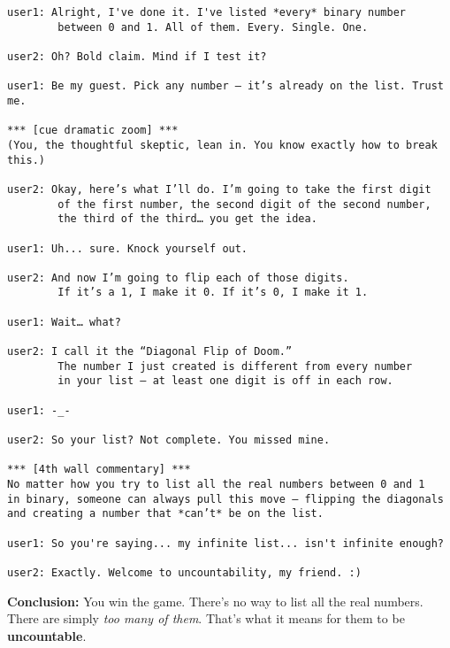 \begin{verbatim}
user1: Alright, I've done it. I've listed *every* binary number 
        between 0 and 1. All of them. Every. Single. One.

user2: Oh? Bold claim. Mind if I test it?

user1: Be my guest. Pick any number — it’s already on the list. Trust me.

*** [cue dramatic zoom] ***
(You, the thoughtful skeptic, lean in. You know exactly how to break this.)

user2: Okay, here’s what I’ll do. I’m going to take the first digit 
        of the first number, the second digit of the second number, 
        the third of the third… you get the idea.

user1: Uh... sure. Knock yourself out.

user2: And now I’m going to flip each of those digits.
        If it’s a 1, I make it 0. If it’s 0, I make it 1.

user1: Wait… what?

user2: I call it the “Diagonal Flip of Doom.” 
        The number I just created is different from every number 
        in your list — at least one digit is off in each row.

user1: -_-

user2: So your list? Not complete. You missed mine.

*** [4th wall commentary] ***
No matter how you try to list all the real numbers between 0 and 1 
in binary, someone can always pull this move — flipping the diagonals 
and creating a number that *can’t* be on the list.

user1: So you're saying... my infinite list... isn't infinite enough?

user2: Exactly. Welcome to uncountability, my friend. :)
\end{verbatim}


\medskip

\noindent
\textbf{Conclusion:} You win the game. There’s no way to list all the real numbers. There are simply \textit{too many of them}. That’s what it means for them to be \textbf{uncountable}.


  



